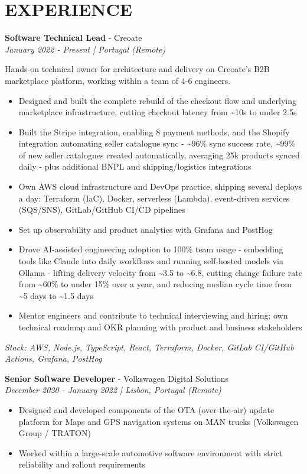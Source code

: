 \documentclass[11pt,a4paper]{article}
\newcommand{\cventry}[4]{%
  \textbf{#1} - #2\\
  {\small\color{subtext}\textit{#3 | #4}}\par\vspace{3pt}
}
\newcommand{\cvintro}[1]{#1\par\vspace{3pt}}
\newenvironment{cvitems}{\begin{itemize}[leftmargin=1.3em,itemsep=3pt,topsep=4pt,parsep=0pt]}{\end{itemize}}
\newcommand{\cvstack}[1]{{\small\color{subtext}\textit{Stack: #1}}\par}
\begin{document}
\section{EXPERIENCE}

\cventry{Software Technical Lead}{Creoate}{January 2022 - Present}{Portugal (Remote)}
\cvintro{Hands-on technical owner for architecture and delivery on Creoate's B2B marketplace platform, working within a team of 4-6 engineers.}
\begin{cvitems}
  \item Designed and built the complete rebuild of the checkout flow and underlying marketplace infrastructure, cutting checkout latency from \textasciitilde{}10s to under 2.5s
  \item Built the Stripe integration, enabling 8 payment methods, and the Shopify integration automating seller catalogue sync - \textasciitilde{}96\% sync success rate, \textasciitilde{}99\% of new seller catalogues created automatically, averaging 25k products synced daily - plus additional BNPL and shipping/logistics integrations
  \item Own AWS cloud infrastructure and DevOps practice, shipping several deploys a day: Terraform (IaC), Docker, serverless (Lambda), event-driven services (SQS/SNS), GitLab/GitHub CI/CD pipelines
  \item Set up observability and product analytics with Grafana and PostHog
  \item Drove AI-assisted engineering adoption to 100\% team usage - embedding tools like Claude into daily workflows and running self-hosted models via Ollama - lifting delivery velocity from \textasciitilde{}3.5 to \textasciitilde{}6.8, cutting change failure rate from \textasciitilde{}60\% to under 15\% over a year, and reducing median cycle time from \textasciitilde{}5 days to \textasciitilde{}1.5 days
  \item Mentor engineers and contribute to technical interviewing and hiring; own technical roadmap and OKR planning with product and business stakeholders
\end{cvitems}
\cvstack{AWS, Node.js, TypeScript, React, Terraform, Docker, GitLab CI/GitHub Actions, Grafana, PostHog}

\vspace{5pt}
\cventry{Senior Software Developer}{Volkswagen Digital Solutions}{December 2020 - January 2022}{Lisbon, Portugal (Remote)}
\begin{cvitems}
  \item Designed and developed components of the OTA (over-the-air) update platform for Maps and GPS navigation systems on MAN trucks (Volkswagen Group / TRATON)
  \item Worked within a large-scale automotive software environment with strict reliability and rollout requirements
\end{cvitems}
\end{document}
